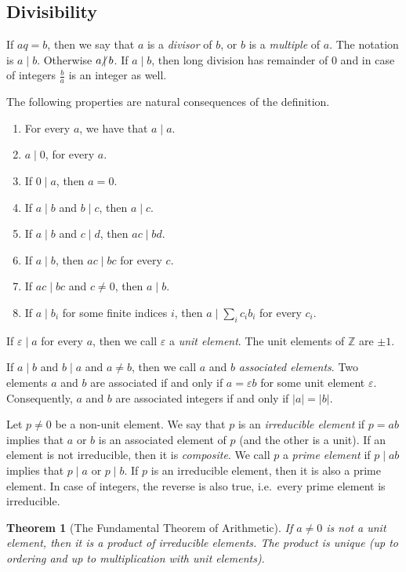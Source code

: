 \documentclass{article}
\newcommand{\Z}{\mathbb{Z}}
\newcommand{\nmid}{\hspace{-4pt}\not|\hspace{2pt}}
\newtheorem{theorem}{Theorem}
\begin{document}
\subsection{Divisibility}

If $aq=b$, then we say that $a$ is a \emph{divisor} of $b$, or $b$ is a \emph{multiple} of $a$.
The notation is $a \mid b$. Otherwise $a \nmid b$.
If $a \mid b$, then long division has remainder of $0$ and in case of integers $\frac{b}{a}$ is an integer as well.

The following properties are natural consequences of the definition.
\begin{enumerate}
    \item For every $a$, we have that $a \mid a$.
    \item $a \mid 0$, for every $a$.
    \item If $0 \mid a$, then $a=0$.
    \item If $a \mid b$ and $b \mid c$, then $a \mid c$.
    \item If $a \mid b$ and $c \mid d$, then $ac \mid bd$.
    \item If $a \mid b$, then $ac \mid bc$ for every $c$.
    \item If $ac \mid bc$ and $c \neq 0$, then $a \mid b$.
    \item If $a \mid b_i$ for some finite indices $i$, then $a \mid \sum_i c_i b_i$ for every $c_i$.
\end{enumerate}

If $\varepsilon \mid a$ for every $a$, then we call $\varepsilon$ a \emph{unit element}.
The unit elements of $\Z$ are $\pm 1$.

If $a \mid b$ and $b \mid a$ and $a \neq b$, then we call $a$ and $b$ \emph{associated elements}.
Two elements $a$ and $b$ are associated if and only if $a=\varepsilon b$ for some unit element $\varepsilon$.
Consequently, $a$ and $b$ are associated integers if and only if $|a| = |b|$.

Let $p \neq 0$ be a non-unit element.
We say that $p$ is an \emph{irreducible element} if $p=ab$ implies that $a$ or $b$ is an associated element of $p$ (and the other is a unit).
If an element is not irreducible, then it is \emph{composite}.
We call $p$ a \emph{prime element} if $p \mid ab$ implies that $p \mid a$ or $p \mid b$.
If $p$ is an irreducible element, then it is also a prime element.
In case of integers, the reverse is also true, i.e.\ every prime element is irreducible.

\begin{theorem}[The Fundamental Theorem of Arithmetic]
    \label{th:fta}
    If $a \neq 0$ is not a unit element, then it is a product of irreducible elements.
    The product is unique (up to ordering and up to multiplication with unit elements).
\end{theorem}
\end{document}
